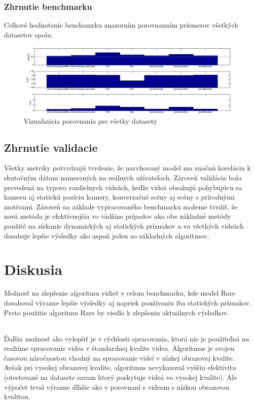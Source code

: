 \subsubsection{Zhrnutie benchmarku}
Celkové hodnotenie benchamrku znazorním porovnanním priemerov všetkých datasetov spolu.

\begin{figure}[H]
  \includegraphics[width=15cm]{pics/benchmark.png}
  \caption{Vizualizácia porovnania pre všetky datasety}
\end{figure}

\subsection{Zhrnutie validacie}
Všetky metriky potvrdzujú tvrdenie, že narvhovaný model ma značnú koreláciu k skutočným dátam nameraných na reálnych užívateľoch.
Zároveň validácia bola prevedená na typovo rozdielnych videách, keďže videá obsahujú pohybujúcu sa kameru aj statickú pozíciu kamery, konverzačné scény aj scény s prírodnými motívami.
Zároveň na základe vypracovaného benchmarku možeme tvrdiť, že nová metóda je efektívnejšia vo vädšine prípadov ako obe základné metódy použité na získanie dynamických aj statických príznakov a vo všetkých videách dosahuje lepšie výsledky ako aspoň jeden zo základných algoritmov.

\section{Diskusia}
\label{ssec:diskusia}
Možnosť na zlepšenie algoritmu vidieť v celom benchmarku, kde model Rare\cite{rare-1} dosahoval výrazne lepšie výsledky aj napriek používaniu iba statických príznakov.
Preto použitie algoritmu Rare\cite{rare-1} by viedlo k zlepšeniu aktuálnych výsledkov.

\\

Ďaľšia možnosť ako vylepšiť je v rýchlosti spracovania, ktorá nie je použiteľná na realtime spracovanie videa v štandardnej kvalite videa.
Algoritmus je svojou časovou náročnosťou vhodný na spracovanie videí v nízkej obrazovej kvalite.
Avšak pri vysokej obrazovej kvalite, algoritmus nevykazoval vyššiu efektivitu (otestované na datasete savam\cite{savam} ktorý poskytuje videá vo vysokej kvalite).
Ale výpočet trval výrazne dlhšie ako v porovnaní s videom s nízkou obrazovou kvalitou.

